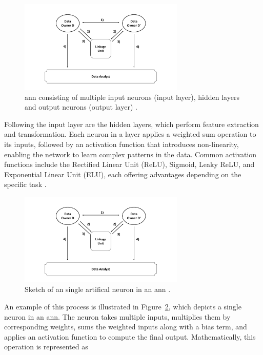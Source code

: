 \begin{figure}[H]
  \centering
  \includegraphics[width=0.7\textwidth, page=15]{img/visualization.pdf}
  \caption{\ac{ann} consisting of multiple input neurons (input layer), hidden layers and output neurons (output layer) \cite{annimage}.}
  \label{fig:annexample}
\end{figure}


Following the input layer are the hidden layers, which perform feature extraction and transformation.
Each neuron in a layer applies a weighted sum operation to its inputs, followed by an activation function that introduces non-linearity, enabling the network to learn complex patterns in the data. Common activation functions include the Rectified Linear Unit (ReLU), Sigmoid, Leaky ReLU, and Exponential Linear Unit (ELU), each offering advantages depending on the specific task \cite{sharma2017activation,russell2016artificial}.

\begin{figure}[H]
  \centering
  \includegraphics[width=0.7\textwidth, page=16]{img/visualization.pdf}
  \caption{Sketch of an single artifical neuron in an \ac{ann} \cite{neuronimage}.}
  \label{fig:neuronexample}
\end{figure}

An example of this process is illustrated in Figure~\ref{fig:neuronexample}, which depicts a single neuron in an \ac{ann}.
The neuron takes multiple inputs, multiplies them by corresponding weights, sums the weighted inputs along with a bias term, and applies an activation function to compute the final output.
Mathematically, this operation is represented as

